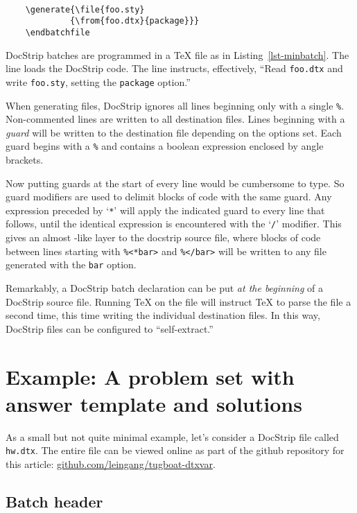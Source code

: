 \documentclass{ltugboat}
\newcommand{\fn}[1]{\texttt{#1}}  %
\newcommand{\opt}[1]{\texttt{#1}} %
\newcommand{\docstrip}{\texorpdfstring{\textsf{DocStrip}}{DocStrip}}
\begin{document}
\begin{lstlisting}[float,
    numbers=none,
    caption={A minimal \docstrip{} batch file},
    label={lst-minbatch}
]
     
    \generate{\file{foo.sty}
             {\from{foo.dtx}{package}}}
    \endbatchfile
\end{lstlisting}

\docstrip{} batches are programmed in a \TeX{} file as in
Listing~\ref{lst-minbatch}.  The  line loads the \docstrip{} code.
The  line instructs, effectively, ``Read \fn{foo.dtx} and write
\fn{foo.sty}, setting the \opt{package} option.''

When generating files, \docstrip{} ignores all lines beginning only with a
single \verb!%!.  Non-commented lines are written to all destination files.
Lines beginning with a \emph{guard} will be written to the destination file
depending on the options set.  Each guard begins with a \verb!%! and contains a
boolean expression enclosed by angle brackets.

Now putting guards at the start of every line would be cumbersome to type.  So
guard modifiers are used to delimit blocks of code with the same guard.  Any
expression preceded by `\verb|*|' will apply the indicated guard to every line
that follows, until the identical expression is encountered with the `\verb|/|'
modifier.  This gives an almost -like layer to the docstrip source
file, where blocks of code between lines starting with \verb!%<*bar>! and
\verb!%</bar>! will be written to any file generated with the \opt{bar} option.

Remarkably, a \docstrip{} batch declaration can be put \emph{at the beginning}
of a \docstrip{} source file.  Running \TeX{} on the file will instruct \TeX{}
to parse the file a second time, this time writing the individual destination
files.  In this way, \docstrip{} files can be configured to ``self-extract.''

\section{Example: A problem set with answer template and solutions}
\label{sec-exam}

As a small but not quite minimal example, let's consider a \docstrip{} file
called \fn{hw.dtx}.  The entire file can be viewed online as part of the github
repository for this article: \url{github.com/leingang/tugboat-dtxvar}.

\subsection{Batch header}
\end{document}

